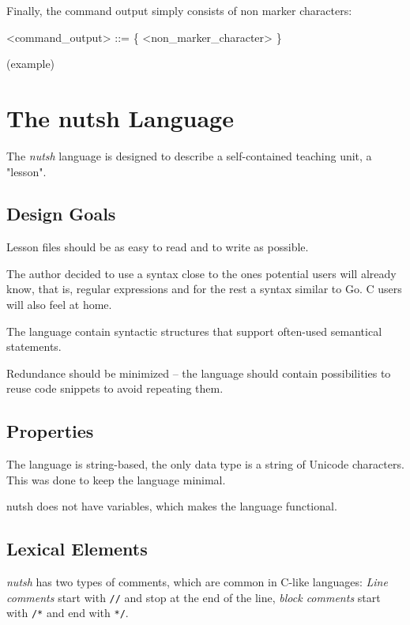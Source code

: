 \documentclass[paper=a4,abstract=on,cleardoublepage=empty,numbers=noenddot,toc=bib]{scrreprt}
\begin{document}
Finally, the command output simply consists of non marker characters:

\begin{grammar}
<command_output> ::= \{ <non_marker_character> \}
\end{grammar}


(example)

\chapter{The nutsh Language}

The \emph{nutsh} language is designed to describe a self-contained teaching unit, a "lesson".

\section{Design Goals}

Lesson files should be as easy to read and to write as possible.

The author decided to use a syntax close to the ones potential users will already know, that is, regular expressions and for the rest a syntax similar to Go. C users will also feel at home.

The language contain syntactic structures that support often-used semantical statements.

Redundance should be minimized -- the language should contain possibilities to reuse code snippets to avoid repeating them.

\section{Properties}

The language is string-based, the only data type is a string of Unicode characters. This was done to keep the language minimal.

nutsh does not have variables, which makes the language functional.

\section{Lexical Elements}


\emph{nutsh} has two types of comments, which are common in C-like languages: \emph{Line comments} start with \texttt{//} and stop at the end of the line, \emph{block comments} start with \texttt{/*} and end with \texttt{*/}.
\end{document}

